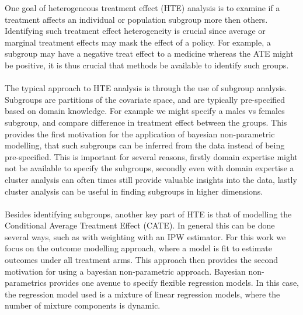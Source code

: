 \documentclass{article}
\begin{document}
One goal of heterogeneous treatment effect (HTE) analysis is to examine if a treatment affects an individual or population subgroup more then others. Identifying such treatment effect heterogeneity is crucial since average or marginal treatment effects may mask the effect of a policy. For example, a subgroup may have a negative treat effect to a medicine whereas the ATE might be positive, it is thus crucial that methods be available to identify such groups. 
\\ \\
The typical approach to HTE analysis is through the use of subgroup analysis. Subgroups are partitions of the covariate space, and are typically pre-specified based on domain knowledge. For example we might specify a males vs females subgroup, and compare difference in treatment effect between the groups. This provides the first motivation for the application of bayesian non-parametric modelling, that such subgroups can be inferred from the data instead of being pre-specified. This is important for several reasons, firstly domain expertise might not be available to specify the subgroups, secondly even with domain expertise a cluster analysis can often times still provide valuable insights into the data, lastly cluster analysis can be useful in finding subgroups in higher dimensions.
\\ \\ 
Besides identifying subgroups, another key part of HTE is that of modelling the Conditional Average Treatment Effect (CATE). In general this can be done several ways, such as with weighting with an IPW estimator. For this work we focus on the outcome modelling approach, where a model is fit to estimate outcomes under all treatment arms. This approach then provides the second motivation for using a bayesian non-parametric approach. Bayesian non-parametrics provides one avenue to specify flexible regression models. In this case, the regression model used is a mixture of linear regression models, where the number of mixture components is dynamic. 
\\ \\
\end{document}
